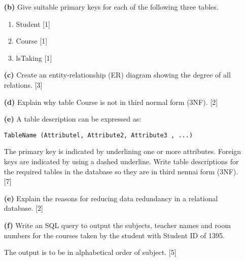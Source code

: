 \newpage
\begin{enumerate}
\item[\textbf{(b)}] Give suitable primary keys for each of the following three tables. 
\begin{enumerate}
\item Student \hfill{}{[}1{]}
\item Course \hfill{} {[}1{]}
\item lsTaking \hfill{}{[}1{]}
\end{enumerate}
\item[\textbf{(c)}] Create an entity-relationship (ER) diagram showing the degree of
all relations. \hfill{} {[}3{]}
\item[\textbf{(d)}] Explain why table Course is not in third normal form (3NF). \hfill{}
{[}2{]}
\item[\textbf{(e)}] A table description can be expressed as: 

\texttt{TableName (Attributel, Attribute2, Attribute3 , ...) }

The primary key is indicated by underlining one or more attributes.
Foreign keys are indicated by using a dashed underline. Write table
descriptions for the required tables in the database so they are in
third nennai form (3NF). \hfill{}{[}7{]}
\item[\textbf{(e)}] Explain the reasons for reducing data redundancy in a relational
database. \hfill{} {[}2{]}
\item[\textbf{(f)}] Write an SQL query to output the subjects, teacher names and room
numbers for the courses taken by the student with Student ID of 1395. 

The output is to be in alphabetical order of subject. \hfill{}{[}5{]}
\end{enumerate}